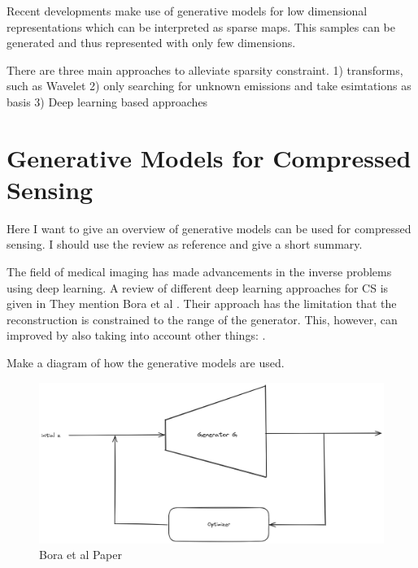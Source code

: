 Recent developments make use of generative models for low dimensional representations which can be interpreted as sparse maps.
This samples can be generated and thus represented with only few dimensions.

There are three main approaches to alleviate sparsity constraint.
1) transforms, such as Wavelet
2) only searching for unknown emissions and take esimtations as basis
3) Deep learning based approaches

\section{Generative Models for Compressed Sensing}
Here I want to give an overview of generative models can be used for compressed sensing.
I should use the review as reference and give a short summary.

The field of medical imaging has made advancements in the inverse problems using deep learning.
A review of different deep learning approaches for CS is given in \parencite{ReviewCSUsingAI}
They mention Bora et al \parencite{CSUsingAI}.
Their approach has the limitation that the reconstruction is constrained to the range of the generator.
This, however, can improved by also taking into account other things: \parencite{SparseCSUsingAI}.

Make a diagram of how the generative models are used.
\begin{figure}[h!]
    \centering
    \includegraphics[width=\textwidth]{figures/02_related_work/bora_et_al.png}
    \caption{Bora et al Paper}
\end{figure}


